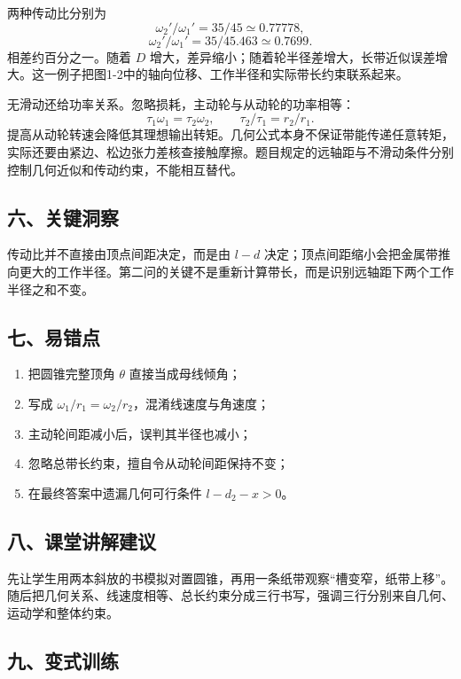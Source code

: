 \documentclass[12pt,a4paper,UTF8]{ctexart}
\newcommand{\tightlist}{\setlength{\itemsep}{0pt}\setlength{\parskip}{0pt}}
\begin{document}
两种传动比分别为 \[
\omega_2'/\omega_1'=35/45\simeq0.77778,
\] \[
\omega_2'/\omega_1'=35/45.463\simeq0.7699.
\] 相差约百分之一。随着 \(D\)
增大，差异缩小；随着轮半径差增大，长带近似误差增大。这一例子把图1-2中的轴向位移、工作半径和实际带长约束联系起来。

无滑动还给功率关系。忽略损耗，主动轮与从动轮的功率相等： \[
\tau_1\omega_1=\tau_2\omega_2,
\qquad\tau_2/\tau_1=r_2/r_1.
\]
提高从动轮转速会降低其理想输出转矩。几何公式本身不保证带能传递任意转矩，实际还要由紧边、松边张力差核查接触摩擦。题目规定的远轴距与不滑动条件分别控制几何近似和传动约束，不能相互替代。

\subsection{六、关键洞察}\label{ux516dux5173ux952eux6d1eux5bdf}

传动比并不直接由顶点间距决定，而是由 \(l-d\)
决定；顶点间距缩小会把金属带推向更大的工作半径。第二问的关键不是重新计算带长，而是识别远轴距下两个工作半径之和不变。

\subsection{七、易错点}\label{ux4e03ux6613ux9519ux70b9}

\begin{enumerate}
\def\labelenumi{\arabic{enumi}.}
\tightlist
\item
  把圆锥完整顶角 \(\theta\) 直接当成母线倾角；
\item
  写成 \(\omega_1/r_1=\omega_2/r_2\)，混淆线速度与角速度；
\item
  主动轮间距减小后，误判其半径也减小；
\item
  忽略总带长约束，擅自令从动轮间距保持不变；
\item
  在最终答案中遗漏几何可行条件 \(l-d_2-x>0\)。
\end{enumerate}

\subsection{八、课堂讲解建议}\label{ux516bux8bfeux5802ux8bb2ux89e3ux5efaux8bae}

先让学生用两本斜放的书模拟对置圆锥，再用一条纸带观察``槽变窄，纸带上移''。随后把几何关系、线速度相等、总长约束分成三行书写，强调三行分别来自几何、运动学和整体约束。

\subsection{九、变式训练}\label{ux4e5dux53d8ux5f0fux8badux7ec3}
\end{document}
